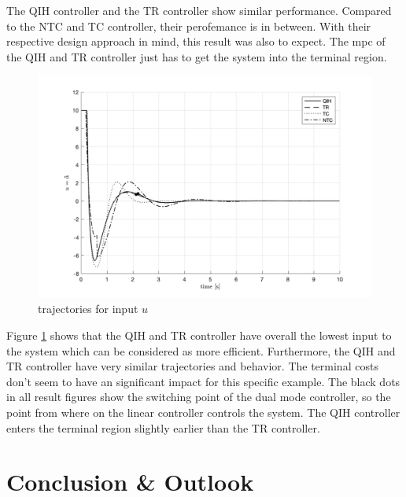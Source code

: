 \documentclass[10pt,a4paper]{article}
\begin{document}
The QIH controller and the TR controller show similar performance. Compared to the NTC and TC controller, their perofemance is in between. With their respective 
design approach in mind, this result was also to expect. The \gls{mpc} of the QIH and TR controller just has to get the system into the terminal region.

\begin{figure}[h]
	\begin{center}
		\includegraphics[width=\textwidth]{img/bb_time_u.png}
		\caption{trajectories for input $u$}
		\label{pic:bb_time_u}
	\end{center}
\end{figure}

Figure \ref{pic:bb_time_u} shows that the QIH and TR controller have overall the lowest input to the system which can be considered as more efficient. 
Furthermore, the QIH and TR controller have very similar
trajectories and behavior. The terminal costs don't seem to have an significant impact for this specific example. The black dots in all result figures show the
switching point of the dual mode controller, so the point from where on the linear controller controls the system. The QIH controller enters the terminal region
slightly earlier than the TR controller. 









\section{Conclusion \& Outlook}
\label{sec:conclusion}
\end{document}
